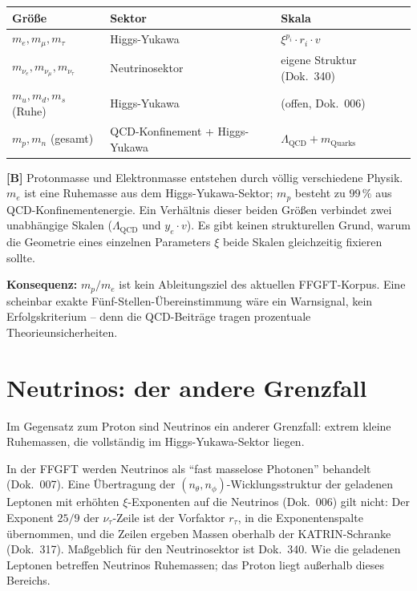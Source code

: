 \begin{center}
\begin{tabular}{lll}
\toprule
Größe & Sektor & Skala \\
\midrule
$m_e, m_\mu, m_\tau$ & Higgs-Yukawa & $\xi^{p_i} \cdot r_i \cdot v$ \\
$m_{\nu_e}, m_{\nu_\mu}, m_{\nu_\tau}$ & Neutrinosektor & eigene Struktur (Dok.~340) \\
$m_u, m_d, m_s$ (Ruhe) & Higgs-Yukawa & (offen, Dok.~006) \\
$m_p, m_n$ (gesamt) & QCD-Konfinement + Higgs-Yukawa
  & $\Lambda_{\mathrm{QCD}} + m_{\mathrm{Quarks}}$ \\
\bottomrule
\end{tabular}
\end{center}

\textbf{[B]} Protonmasse und Elektronmasse entstehen durch völlig
verschiedene Physik. $m_e$ ist eine Ruhemasse aus dem Higgs-Yukawa-Sektor;
$m_p$ besteht zu $99\,\%$ aus QCD-Konfinementenergie. Ein Verhältnis
dieser beiden Größen verbindet zwei unabhängige Skalen
($\Lambda_{\mathrm{QCD}}$ und $y_e \cdot v$). Es gibt keinen
strukturellen Grund, warum die Geometrie eines einzelnen Parameters
$\xi$ beide Skalen gleichzeitig fixieren sollte.

\textbf{Konsequenz:} $m_p/m_e$ ist kein Ableitungsziel des aktuellen
FFGFT-Korpus. Eine scheinbar exakte Fünf-Stellen-Übereinstimmung wäre
ein Warnsignal, kein Erfolgskriterium -- denn die QCD-Beiträge tragen
prozentuale Theorieunsicherheiten.

\section{Neutrinos: der andere Grenzfall}

Im Gegensatz zum Proton sind Neutrinos ein anderer Grenzfall:
extrem kleine Ruhemassen, die vollständig im Higgs-Yukawa-Sektor liegen.

In der FFGFT werden Neutrinos als ``fast masselose Photonen''
behandelt (Dok.~007). Eine Übertragung der $(n_\theta, n_\phi)$-Wicklungs\-struktur
der geladenen Leptonen mit erhöhten $\xi$-Exponenten auf die Neutrinos
(Dok.~006) gilt nicht: Der Exponent $25/9$ der $\nu_\tau$-Zeile ist der
Vorfaktor $r_\tau$, in die Exponentenspalte übernommen, und die Zeilen
ergeben Massen oberhalb der KATRIN-Schranke (Dok.~317). Maßgeblich für
den Neutrinosektor ist Dok.~340. Wie die geladenen Leptonen betreffen
Neutrinos Ruhemassen; das Proton liegt außerhalb dieses Bereichs.


